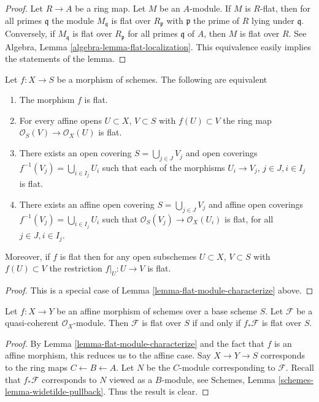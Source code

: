 \begin{proof}
Let $R \to A$ be a ring map. Let $M$ be an $A$-module.
If $M$ is $R$-flat, then for all primes
$\mathfrak q$ the module $M_{\mathfrak q}$ is flat over $R_{\mathfrak p}$
with $\mathfrak p$ the prime of $R$ lying under $\mathfrak q$. Conversely, if
$M_{\mathfrak q}$ is flat over $R_{\mathfrak p}$ for all primes $\mathfrak q$
of $A$, then $M$ is flat over $R$. See
Algebra, Lemma \ref{algebra-lemma-flat-localization}.
This equivalence easily implies the statements of the lemma.
\end{proof}

\begin{lemma}
\label{lemma-flat-characterize}
Let $f : X \to S$ be a morphism of schemes.
The following are equivalent
\begin{enumerate}
\item The morphism $f$ is flat.
\item For every affine opens $U \subset X$, $V \subset S$
with $f(U) \subset V$ the ring map
$\mathcal{O}_S(V) \to \mathcal{O}_X(U)$ is flat.
\item There exists an open covering $S = \bigcup_{j \in J} V_j$
and open coverings $f^{-1}(V_j) = \bigcup_{i \in I_j} U_i$ such
that each of the morphisms $U_i \to V_j$, $j\in J, i\in I_j$
is flat.
\item There exists an affine open covering $S = \bigcup_{j \in J} V_j$
and affine open coverings $f^{-1}(V_j) = \bigcup_{i \in I_j} U_i$ such
that $\mathcal{O}_S(V_j) \to \mathcal{O}_X(U_i)$ is flat, for all
$j\in J, i\in I_j$.
\end{enumerate}
Moreover, if $f$ is flat then for
any open subschemes $U \subset X$, $V \subset S$ with $f(U) \subset V$
the restriction $f|_U : U \to V$ is flat.
\end{lemma}

\begin{proof}
This is a special case of Lemma \ref{lemma-flat-module-characterize}
above.
\end{proof}

\begin{lemma}
\label{lemma-pushforward-flat-affine}
Let $f : X \to Y$ be an affine morphism of schemes over a base scheme $S$.
Let $\mathcal{F}$ be a quasi-coherent $\mathcal{O}_X$-module.
Then $\mathcal{F}$ is flat over $S$ if and only if
$f_*\mathcal{F}$ is flat over $S$.
\end{lemma}

\begin{proof}
By Lemma \ref{lemma-flat-module-characterize} and the fact that
$f$ is an affine morphism, this reduces us to the affine case.
Say $X \to Y \to S$ corresponds to the ring maps $C \leftarrow B \leftarrow A$.
Let $N$ be the $C$-module corresponding to $\mathcal{F}$.
Recall that $f_*\mathcal{F}$ corresponds to $N$ viewed as a $B$-module, see
Schemes, Lemma \ref{schemes-lemma-widetilde-pullback}.
Thus the result is clear.
\end{proof}

